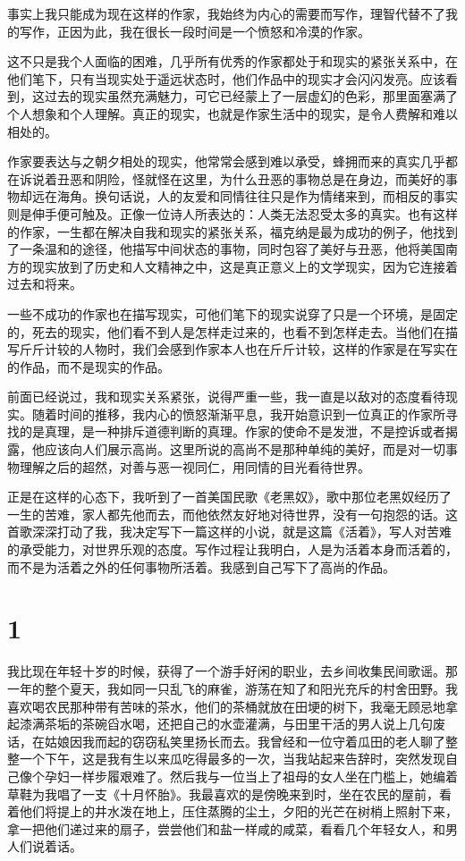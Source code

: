 \documentclass[12pt,UTF8]{ctexbook}
\begin{document}
事实上我只能成为现在这样的作家，我始终为内心的需要而写作，理智代替不了我的写作，正因为此，我在很长一段时间是一个愤怒和冷漠的作家。

这不只是我个人面临的困难，几乎所有优秀的作家都处于和现实的紧张关系中，在他们笔下，只有当现实处于遥远状态时，他们作品中的现实才会闪闪发亮。应该看到，这过去的现实虽然充满魅力，可它已经蒙上了一层虚幻的色彩，那里面塞满了个人想象和个人理解。真正的现实，也就是作家生活中的现实，是令人费解和难以相处的。

作家要表达与之朝夕相处的现实，他常常会感到难以承受，蜂拥而来的真实几乎都在诉说着丑恶和阴险，怪就怪在这里，为什么丑恶的事物总是在身边，而美好的事物却远在海角。换句话说，人的友爱和同情往往只是作为情绪来到，而相反的事实则是伸手便可触及。正像一位诗人所表达的：人类无法忍受太多的真实。也有这样的作家，一生都在解决自我和现实的紧张关系，福克纳是最为成功的例子，他找到了一条温和的途径，他描写中间状态的事物，同时包容了美好与丑恶，他将美国南方的现实放到了历史和人文精神之中，这是真正意义上的文学现实，因为它连接着过去和将来。

一些不成功的作家也在描写现实，可他们笔下的现实说穿了只是一个环境，是固定的，死去的现实，他们看不到人是怎样走过来的，也看不到怎样走去。当他们在描写斤斤计较的人物时，我们会感到作家本人也在斤斤计较，这样的作家是在写实在的作品，而不是现实的作品。

前面已经说过，我和现实关系紧张，说得严重一些，我一直是以敌对的态度看待现实。随着时间的推移，我内心的愤怒渐渐平息，我开始意识到一位真正的作家所寻找的是真理，是一种排斥道德判断的真理。作家的使命不是发泄，不是控诉或者揭露，他应该向人们展示高尚。这里所说的高尚不是那种单纯的美好，而是对一切事物理解之后的超然，对善与恶一视同仁，用同情的目光看待世界。

正是在这样的心态下，我听到了一首美国民歌《老黑奴》，歌中那位老黑奴经历了一生的苦难，家人都先他而去，而他依然友好地对待世界，没有一句抱怨的话。这首歌深深打动了我，我决定写下一篇这样的小说，就是这篇《活着》，写人对苦难的承受能力，对世界乐观的态度。写作过程让我明白，人是为活着本身而活着的，而不是为活着之外的任何事物所活着。我感到自己写下了高尚的作品。

\mainmatter

\chapter{1}

我比现在年轻十岁的时候，获得了一个游手好闲的职业，去乡间收集民间歌谣。那一年的整个夏天，我如同一只乱飞的麻雀，游荡在知了和阳光充斥的村舍田野。我喜欢喝农民那种带有苦味的茶水，他们的茶桶就放在田埂的树下，我毫无顾忌地拿起漆满茶垢的茶碗舀水喝，还把自己的水壶灌满，与田里干活的男人说上几句废话，在姑娘因我而起的窃窃私笑里扬长而去。我曾经和一位守着瓜田的老人聊了整整一个下午，这是我有生以来瓜吃得最多的一次，当我站起来告辞时，突然发现自己像个孕妇一样步履艰难了。然后我与一位当上了祖母的女人坐在门槛上，她编着草鞋为我唱了一支《十月怀胎》。我最喜欢的是傍晚来到时，坐在农民的屋前，看着他们将提上的井水泼在地上，压住蒸腾的尘土，夕阳的光芒在树梢上照射下来，拿一把他们递过来的扇子，尝尝他们和盐一样咸的咸菜，看看几个年轻女人，和男人们说着话。
\end{document}

